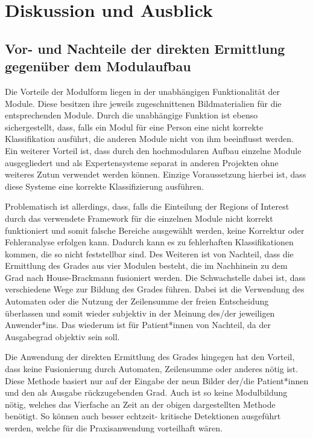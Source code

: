 \chapter{Diskussion und Ausblick}\label{discussion}
\section{Vor- und Nachteile der direkten Ermittlung gegenüber dem Modulaufbau}\label{di_vs_module}
Die Vorteile der Modulform liegen in der unabhängigen Funktionalität der Module. Diese besitzen ihre jeweils zugeschnittenen Bildmaterialien für die entsprechenden Module. Durch die unabhängige Funktion ist ebenso sichergestellt, dass, falls ein Modul für eine Person eine nicht korrekte Klassifikation ausführt, die anderen Module nicht von ihm beeinflusst werden. Ein weiterer Vorteil ist, dass durch den hochmodularen Aufbau einzelne Module ausgegliedert und als Expertensysteme separat in anderen Projekten ohne weiteres Zutun verwendet werden können. Einzige Voraussetzung hierbei ist, dass diese Systeme eine korrekte Klassifizierung ausführen.

Problematisch ist allerdings, dass, falls die Einteilung der Regions of Interest durch das verwendete Framework für die einzelnen Module nicht korrekt funktioniert und somit falsche Bereiche ausgewählt werden, keine Korrektur oder Fehleranalyse erfolgen kann. Dadurch kann es zu fehlerhaften Klassifikationen kommen, die so nicht feststellbar sind. Des Weiteren ist von Nachteil, dass die Ermittlung des Grades aus vier Modulen besteht, die im Nachhinein zu dem Grad nach House-Brackmann fusioniert werden. Die Schwachstelle dabei ist, dass verschiedene Wege zur Bildung des Grades führen. Dabei ist die Verwendung des Automaten oder die Nutzung der Zeilensumme der freien Entscheidung überlassen und somit wieder subjektiv in der Meinung des/der jeweiligen Anwender*ins. Das wiederum ist für Patient*innen von Nachteil, da der Ausgabegrad objektiv sein soll.

Die Anwendung der direkten Ermittlung des Grades hingegen hat den Vorteil, dass keine Fusionierung durch Automaten, Zeilensumme oder anderes nötig ist. Diese Methode basiert nur auf der Eingabe der neun Bilder der/die Patient*innen und den als Ausgabe rückzugebenden Grad. Auch ist so keine Modulbildung nötig, welches das Vierfache an Zeit an der obigen dargestellten Methode benötigt. So können auch besser echtzeit- kritische Detektionen ausgeführt werden, welche für die Praxisanwendung vorteilhaft wären.


